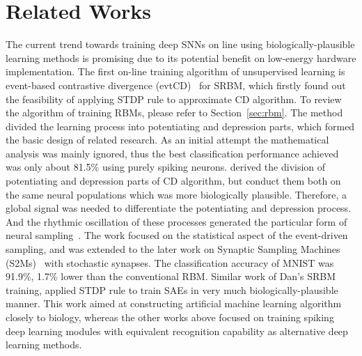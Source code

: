 \section{Related Works}
The current trend towards training deep SNNs on line using biologically-plausible learning methods is promising due to its potential benefit on low-energy hardware implementation.
The first on-line training algorithm of unsupervised learning is event-based contrastive divergence (evtCD)~\cite{neil2013online} for SRBM, which firstly found out the feasibility of applying STDP rule to approximate CD algorithm.
To review the algorithm of training RBMs, please refer to Section~\ref{sec:rbm}.
The method divided the learning process into potentiating and depression parts, which formed the basic design of related research.
As an initial attempt the mathematical analysis was mainly ignored, thus the best classification performance achieved was only about 81.5\% using purely spiking neurons.
\cite{neftci2013event} derived the division of potentiating and depression parts of CD algorithm, but conduct them both on the same neural populations which was more biologically plausible.
Therefore, a global signal was needed to differentiate the potentiating and depression process.
And the rhythmic oscillation of these processes generated the particular form of neural sampling~\cite{petrovici2013stochastic}.
The work focused on the statistical aspect of the event-driven sampling, and was extended to the later work on Synaptic Sampling Machines (S2Ms)~\cite{neftci2016stochastic} with stochastic synapses.
The classification accuracy of MNIST was 91.9\%, 1.7\% lower than the conventional RBM.
Similar work of Dan's SRBM training, \cite{burbank2015mirrored} applied STDP rule to train SAEs in very much biologically-plausible manner.
This work aimed at constructing artificial machine learning algorithm closely to biology, whereas the other works above focused on training spiking deep learning modules with equivalent recognition capability as alternative deep learning methods.


